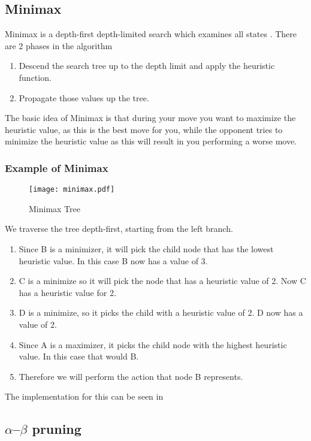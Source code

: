 \subsection{Minimax}

Minimax is a depth-first depth-limited search which examines all states . There are 2 phases in the algorithm
\begin{enumerate}
    \item Descend the search tree up to the depth limit and apply the heuristic function.
    \item Propagate those values up the tree.
\end{enumerate}

The basic idea of Minimax is that during your move you want to maximize the heuristic value, as this is the best move for you, while the opponent tries to minimize the heuristic value as this will result in you performing a worse move.

\subsubsection{Example of Minimax}
\begin{figure}
    \centering
    \texttt{[image: minimax.pdf]}
    \caption{Minimax Tree}
    \label{im:minimax}
\end{figure}

We traverse the tree depth-first, starting from the left branch.

\begin{enumerate}
    \item Since B is a minimizer, it will pick the child node that has the lowest heuristic value. In this case B now has a value of 3.
    \item C is a minimize so it will pick the node that has a heuristic value of 2. Now C has a heuristic value for 2.
    \item D is a minimize, so it picks the child with a heuristic value of 2. D now has a value of 2.
    \item Since A is a maximizer, it picks the child node with the highest heuristic value. In this case that would B.
    \item Therefore we will perform the action that node B represents.
\end{enumerate}

The implementation for this can be seen in 

\subsection{$\alpha$--$\beta$ pruning}

